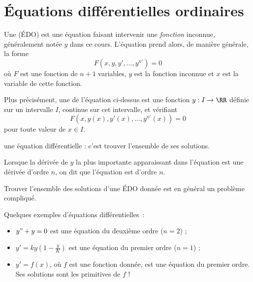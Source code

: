 \part{Équations différentielles ordinaires}
\begin{frame}
  \begin{definition}
    Une  (ÉDO) est une équation\pause{} faisant intervenir une \emph{fonction} inconnue\pause{}, généralement notée \(y\) dans ce cours.\pause{} L'équation prend alors, de manière générale, la forme\pause{}
    \begin{equation*}
      F(x,y,y',\ldots,y^{n\prime})=0
    \end{equation*}\pause{}
    o\`u $F$ est une fonction de $n+1$ variables,\pause{} \(y\) est la fonction inconnue\pause{} et \(x\) est la variable de cette fonction.\pause{}
  \end{definition}
  \begin{definition}\pause
    Plus précisément, une  de l'équation ci-dessus\pause{} est une fonction \(y : I \to \RR\)\pause{} définie sur un intervalle \(I\)\pause{}, continue sur cet intervalle\pause{}, et vérifiant
    \begin{equation*}
      F(x,y(x),y'(x),\ldots,y^{n\prime}(x))=0
    \end{equation*}\pause{}
    pour toute valeur de \(x \in I\).\pause{}
  \end{definition}
\end{frame}
\begin{frame}
  \begin{definition}
     une équation différentielle\pause{} : c'est trouver l'ensemble de ses solutions.
  \end{definition}\pause{}
  \begin{definition}
    Lorsque la dérivée de \(y\) la plus importante apparaissant dans l'équation\pause{} est une dérivée d'ordre \(n\),\pause{} on dit que l'équation est d'ordre $n$.
  \end{definition}
  \pause

  \begin{remark*}\pause
    Trouver l'ensemble des solutions d'une ÉDO donnée\pause{} est en général un problème compliqué.
  \end{remark*}
\end{frame}

\begin{frame}
  \begin{example}
    Quelques exemples d'équations différentielles~:\pause{}
    \begin{itemize}
    \item \(y" + y = 0\) est une équation du deuxième ordre (\(n=2\)) ;\pause{}
    \item \(y' = k y (1 - \frac{y}{K})\) est une équation du premier ordre (\(n=1\)) ;\pause{}
    \item \(y' = f(x)\), où \(f\) est une fonction donnée, est une équation du premier ordre.\pause{} Ses solutions sont les primitives de \(f\) !
    \end{itemize}
  \end{example}
\end{frame}
